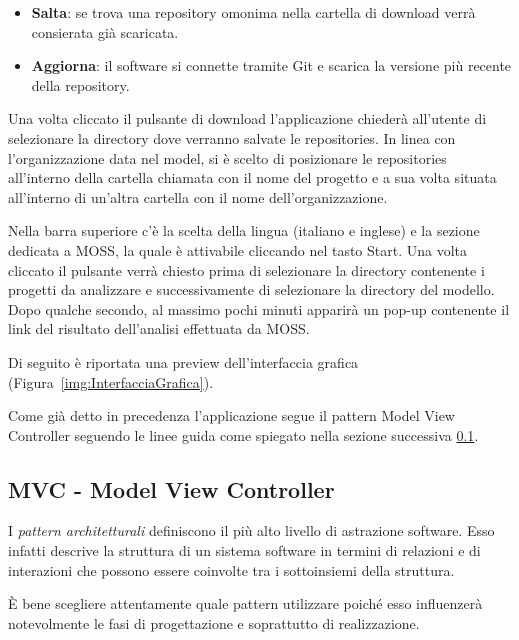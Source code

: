 		\begin{itemize}
			\item \textbf{Salta}: se trova una repository omonima nella cartella di download verrà consierata già scaricata.
			\item \textbf{Aggiorna}: il software si connette tramite Git e scarica la versione più recente della repository.
		\end{itemize}
	
		Una volta cliccato il pulsante di download l'applicazione chiederà all'utente di selezionare la directory dove verranno salvate le repositories.
		In linea con l'organizzazione data nel model, si è scelto di posizionare le repositories all'interno della cartella chiamata con il nome del progetto e a sua volta situata all'interno di un'altra cartella con il nome dell'organizzazione.
		
		Nella barra superiore c'è la scelta della lingua (italiano e inglese) e la sezione dedicata a MOSS, la quale è attivabile cliccando nel tasto Start. Una volta cliccato il pulsante verrà chiesto prima di selezionare la directory contenente i progetti da analizzare e successivamente di selezionare la directory del modello. Dopo qualche secondo, al massimo pochi minuti apparirà un pop-up contenente il link del risultato dell'analisi effettuata da MOSS.
		
		Di seguito è riportata una preview dell'interfaccia grafica (Figura~\ref{img:InterfacciaGrafica}).
		
		\begin{center}
			\label{img:InterfacciaGrafica}
		\end{center}
		
		Come già detto in precedenza l'applicazione segue il pattern Model View Controller seguendo le linee guida come spiegato nella sezione successiva \ref{def:MVC}.
		
		
		\subsection{MVC - Model View Controller}\label{def:MVC}
			I \textit{pattern architetturali} definiscono il più alto livello di astrazione software. 
			Esso infatti descrive la struttura di un sistema software in termini di relazioni e di interazioni che possono essere coinvolte tra i sottoinsiemi della struttura. 
			
			\`E bene scegliere attentamente quale pattern utilizzare poiché esso influenzerà notevolmente le fasi di progettazione e soprattutto di realizzazione. 
			
